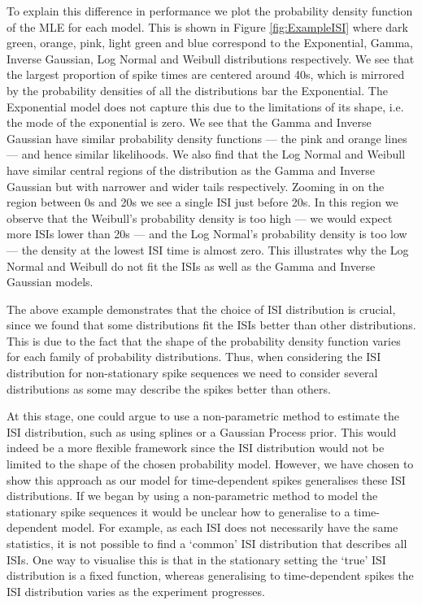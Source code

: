 \documentclass[oneside, 12 pt]{book}
\begin{document}
 To explain this difference in performance we plot the probability density function  of the MLE for each model. This is shown in Figure \ref{fig:ExampleISI} where dark green, orange, pink, light green and blue correspond to the Exponential, Gamma, Inverse Gaussian, Log Normal and Weibull distributions respectively. We see that the largest proportion of spike times are centered around 40s, which is mirrored by the probability densities of all the distributions bar the Exponential. The Exponential model does not capture this due to the limitations of its shape, i.e. the mode of the exponential is zero. We see that the Gamma and Inverse Gaussian have similar probability density functions --- the pink and orange lines --- and hence similar likelihoods. We also find that the Log Normal and Weibull have similar central regions of the distribution as the Gamma and Inverse Gaussian but with narrower and wider tails respectively. Zooming in on the region between 0s and 20s we see a single ISI just before 20s. In this region we observe that the Weibull's probability density is too high --- we would expect more ISIs lower than 20s --- and the Log Normal's probability density is too low --- the density at the lowest ISI time is almost zero. This illustrates why the Log Normal and Weibull do not fit the ISIs as well as the Gamma and Inverse Gaussian models. 


The above example demonstrates that the choice of ISI distribution is crucial, since we found that some distributions fit the  ISIs better than other distributions. This is due to the fact that the shape of the probability density function varies for each family of probability distributions. Thus, when considering the ISI distribution for non-stationary spike sequences we need to consider several distributions as some may  describe the  spikes better than others.

At this stage, one could argue to use a non-parametric method to estimate the ISI distribution, such as using splines or a Gaussian Process prior. This would indeed be a more flexible framework since the ISI distribution would not be limited to the shape of the chosen probability model. However, we have chosen to show this approach as our model for time-dependent  spikes generalises these ISI distributions. If we began by using a non-parametric method to model the stationary spike sequences it would be unclear how to generalise to a time-dependent model. For example, as each ISI does not necessarily have the same statistics, it is not possible to find a `common' ISI distribution that describes all ISIs. One way to visualise this is that in the stationary setting the `true' ISI distribution is a fixed function, whereas generalising to time-dependent spikes the ISI distribution varies as the experiment progresses.  
\end{document}
